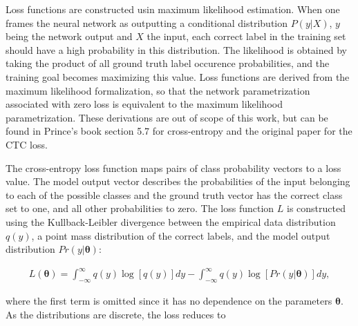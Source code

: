 \documentclass{article}
\begin{document}
Loss functions are constructed usin maximum likelihood estimation. When one frames the neural network as outputting 
a conditional distribution $P(y|X)$, $y$ being the network output and $X$ the input, each correct label in the 
training set should have a high probability in this distribution. The likelihood is obtained by taking the product of 
all ground truth label occurence probabilities, and the training goal becomes maximizing this value. Loss functions are derived 
from the maximum likelihood formalization, so that the network parametrization associated with zero loss is equivalent to 
the maximum likelihood parametrization. These derivations are out of scope of this work, but can be found in Prince's book
section 5.7 \cite{princebook} for cross-entropy and the original paper \cite{ctcloss} for the CTC loss.

The cross-entropy loss function maps pairs of class probability vectors 
to a loss value. The model output vector describes the probabilities 
of the input belonging to each of the possible classes and the ground
 truth vector has the correct 
class set to one, and all other probabilities to zero. The loss function $L$ 
is constructed using the Kullback-Leibler divergence between the empirical data distribution $q(y)$,
a point mass distribution of the correct labels,
 and the model output distribution 
$Pr(y|\mathbf{\theta})$:

\begin{align}
    L(\mathbf{\theta})=\int_{-\infty}^{\infty}q(y)\log[q(y)]dy-\int_{-\infty}^{\infty}q(y)\log[Pr(y|\mathbf{\theta})]dy,
\end{align}

where the first term is omitted since it has no dependence on the parameters $\mathbf{\theta}$.
As the distributions are discrete, the loss reduces to
\end{document}

